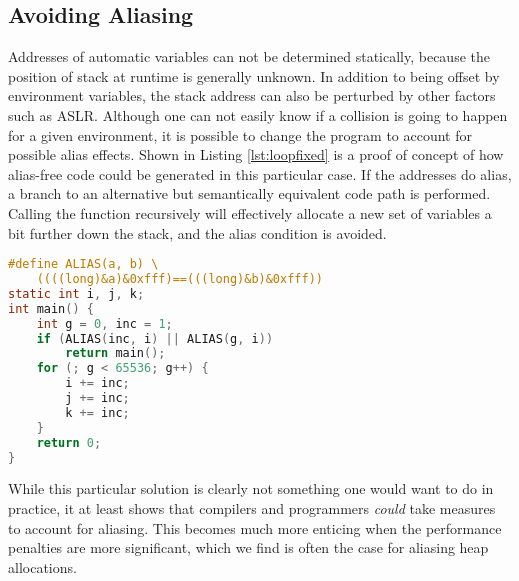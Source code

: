 \documentclass[a4paper,10pt,twocolumn,twoside]{article}
\begin{document}
{\subsection{Avoiding Aliasing}
Addresses of automatic variables can not be determined statically, because the position of stack at runtime is generally unknown. 
In addition to being offset by environment variables, the stack address can also be perturbed by other factors such as ASLR. 
Although one can not easily know if a collision is going to happen for a given environment, it is possible to change the program to account for possible alias effects.
Shown in Listing \ref{lst:loopfixed} is a proof of concept of how alias-free code could be generated in this particular case.
If the addresses do alias, a branch to an alternative but semantically equivalent code path is performed.
Calling the function recursively will effectively allocate a new set of variables a bit further down the stack, and the alias condition is avoided.

\begin{lstlisting}[float=t, language=C, caption={Dynamically detect aliasing case, and avoid by pushing another stack frame.}, label={lst:loopfixed}, frame=lines]
#define ALIAS(a, b) \
    ((((long)&a)&0xfff)==(((long)&b)&0xfff))
static int i, j, k;
int main() {
    int g = 0, inc = 1;
    if (ALIAS(inc, i) || ALIAS(g, i))
        return main();
    for (; g < 65536; g++) {
        i += inc;
        j += inc;
        k += inc;
    }
    return 0;
}
\end{lstlisting}

While this particular solution is clearly not something one would want to do in practice, it at least shows that compilers and programmers \emph{could} take measures to account for aliasing.
This becomes much more enticing when the performance penalties are more significant, which we find is often the case for aliasing heap allocations.



}
\end{document}
